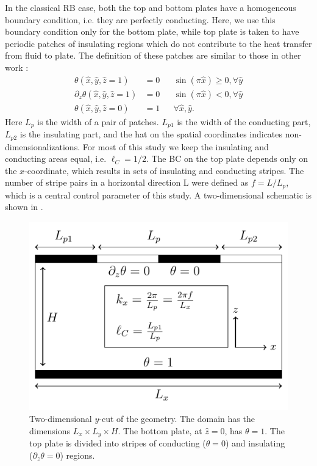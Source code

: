 In the classical RB case, both the top and bottom plates have a homogeneous
boundary condition, i.e. they are perfectly conducting. Here, we use this
boundary condition only for the bottom plate, while top plate is taken to have
periodic patches of insulating regions which do not contribute to the heat
transfer from fluid to plate. The definition of these patches are similar to
those in other work \citep{Ripesi2014}:
%
\begin{equation}
    \begin{aligned}
        \theta(\hat{x},\hat{y},\hat{z}=1) &= 0 &&
        \sin(\pi\hat x) \geq 0, \forall \hat y \\
        \partial_z \theta(\hat{x},\hat{y},\hat{z}=1)  &= 0 &&
        \sin(\pi\hat x) < 0, \forall \hat y \\
        \theta(\hat{x},\hat{y},\hat{z}=0) &= 1 && \forall \hat x, \hat y.  
    \end{aligned}
\label{eq:boundaryConditions} \end{equation}
%
Here $L_p$ is the width of a pair of patches.  $L_{p1}$ is the width of the
conducting part, $L_{p2}$ is the insulating part, and the hat on the spatial
coordinates indicates non-dimensionalizations.  For most of this study we keep
the insulating and conducting areas equal, i.e. $\ell_C=1/2$.  The BC on the
top plate depends only on the $x$-coordinate, which results in sets of
insulating and conducting stripes.  The number of stripe pairs in a horizontal
direction L were defined as $f = L / L_p$, which is a central control
parameter of this study.
A two-dimensional schematic is shown in .

\begin{figure}
\centering
\includegraphics[scale=1]{fig1.pdf}
\caption{%
Two-dimensional $y$-cut of the geometry. The domain has the
dimensions $L_x \times L_y \times H$. The bottom plate, at $\hat{z}=0$,
has $\theta=1$. The top plate is divided into stripes of conducting
($\theta=0$) and insulating ($\partial_z \theta = 0$) regions.}
\label{figure1}
\end{figure}

